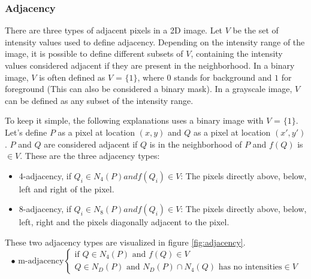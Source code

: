 \subsubsection{Adjacency} There are three types of adjacent pixels in a 2D image. Let $V$ be the set of intensity values used to define adjacency. Depending on the intensity range of the image, it is possible to define different subsets of $V$, containing the intensity values considered adjacent if they are present in the neighborhood. In a binary image, $V$ is often defined as $V$ = $\{1\}$, where $0$ stands for background and $1$ for foreground (This can also be considered a binary mask). In a grayscale image, $V$ can be defined as any subset of the intensity range.

To keep it simple, the following explanations uses a binary image with $V$ = $\{1\}$. Let's define $P$ as a pixel at location $(x,y)$ and $Q$ as a pixel at location $(x',y')$. $P$ and $Q$ are considered adjacent if $Q$ is in the neighborhood of $P$ and $f(Q)$ is $\in V$. These are the three adjacency types:

\begin{itemize}
    \item 4-adjacency, if $Q_i \in N_4(P) and f(Q_i) \in  V$: The pixels directly above, below, left and right of the pixel. 
    \item 8-adjacency, if $Q_i \in N_8(P) and f(Q_i) \in  V$: The pixels directly above, below, left, right and the pixels diagonally adjacent to the pixel.
\end{itemize}
These two adjacency types are visualized in figure \ref{fig:adjacency}.
\begin{equation*}
    \bullet \text{ m-adjacency} \begin{cases}
   \text{if } Q \in N_4(P) \text{ and } f(Q) \in  V \\
    Q \in N_D(P) \text{ and } N_D(P)  \cap N_4(Q) \text{ has no intensities} \in  V
    \end{cases}
    \end{equation*}


